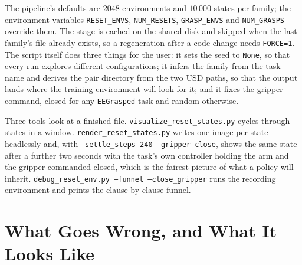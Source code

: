 \documentclass{article}
\newcommand{\code}[1]{\texttt{#1}}
\begin{document}
The pipeline's defaults are $2048$ environments and $10\,000$ states per family; the environment variables \code{RESET\_ENVS}, \code{NUM\_RESETS}, \code{GRASP\_ENVS} and \code{NUM\_GRASPS} override them. The stage is cached on the shared disk and skipped when the last family's file already exists, so a regeneration after a code change needs \code{FORCE=1}. The script itself does three things for the user: it sets the seed to \code{None}, so that every run explores different configurations; it infers the family from the task name and derives the pair directory from the two USD paths, so that the output lands where the training environment will look for it; and it fixes the gripper command, closed for any \code{EEGrasped} task and random otherwise.

Three tools look at a finished file. \code{visualize\_reset\_states.py} cycles through states in a window. \code{render\_reset\_states.py} writes one image per state headlessly and, with \code{--settle\_steps 240 --gripper close}, shows the same state after a further two seconds with the task's own controller holding the arm and the gripper commanded closed, which is the fairest picture of what a policy will inherit. \code{debug\_reset\_env.py --funnel --close\_gripper} runs the recording environment and prints the clause-by-clause funnel.

\section{What Goes Wrong, and What It Looks Like}
\label{sec:failures}
\end{document}
